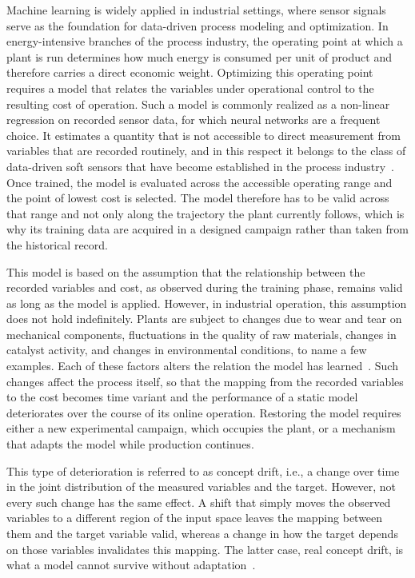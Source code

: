 Machine learning is widely applied in industrial settings, where sensor signals serve as the foundation for data-driven process modeling and optimization. In energy-intensive branches of the process industry, the operating point at which a plant is run determines how much energy is consumed per unit of product and therefore carries a direct economic weight. Optimizing this operating point requires a model that relates the variables under operational control to the resulting cost of operation. Such a model is commonly realized as a non-linear regression on recorded sensor data, for which neural networks are a frequent choice. It estimates a quantity that is not accessible to direct measurement from variables that are recorded routinely, and in this respect it belongs to the class of data-driven soft sensors that have become established in the process industry~\cite{kadlec.2009}. Once trained, the model is evaluated across the accessible operating range and the point of lowest cost is selected. The model therefore has to be valid across that range and not only along the trajectory the plant currently follows, which is why its training data are acquired in a designed campaign rather than taken from the historical record. \par
%
This model is based on the assumption that the relationship between the recorded variables and cost, as observed during the training phase, remains valid as long as the model is applied. However, in industrial operation, this assumption does not hold indefinitely. Plants are subject to changes due to wear and tear on mechanical components, fluctuations in the quality of raw materials, changes in catalyst activity, and changes in environmental conditions, to name a few examples. Each of these factors alters the relation the model has learned~\cite{kadlec.2011}. Such changes affect the process itself, so that the mapping from the recorded variables to the cost becomes time variant and the performance of a static model deteriorates over the course of its online operation. Restoring the model requires either a new experimental campaign, which occupies the plant, or a mechanism that adapts the model while production continues. \par
%
This type of deterioration is referred to as concept drift, i.e., a change over time in the joint distribution of the measured variables and the target. However, not every such change has the same effect. A shift that simply moves the observed variables to a different region of the input space leaves the mapping between them and the target variable valid, whereas a change in how the target depends on those variables invalidates this mapping. The latter case, real concept drift, is what a model cannot survive without adaptation~\cite{gama.2014, bayram.2022a}. 
